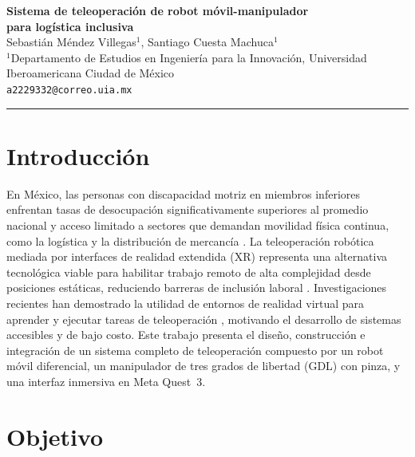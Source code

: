 \documentclass[12pt,letterpaper]{article}
\begin{document}
\begin{center}
    {\large\textbf{Sistema de teleoperación de robot móvil-manipulador\\
    para logística inclusiva}}\\[5pt]
    Sebastián Méndez Villegas$^{1}$, Santiago Cuesta Machuca$^{1}$\\[2pt]
    {\small $^{1}$Departamento de Estudios en Ingeniería para la Innovación,
    Universidad Iberoamericana Ciudad de México}\\[1pt]
    {\small \texttt{a2229332@correo.uia.mx}}
\end{center}
\vspace{4pt}\hrule\vspace{6pt}

\section{Introducción}

En México, las personas con discapacidad motriz en miembros inferiores enfrentan
tasas de desocupación significativamente superiores al promedio nacional y acceso
limitado a sectores que demandan movilidad física continua, como la logística y la
distribución de mercancía \cite{inegi2023}. La teleoperación robótica mediada por
interfaces de realidad extendida (XR) representa una alternativa tecnológica viable
para habilitar trabajo remoto de alta complejidad desde posiciones estáticas, reduciendo
barreras de inclusión laboral \cite{sheridan1992}. Investigaciones recientes han
demostrado la utilidad de entornos de realidad virtual para aprender y ejecutar tareas
de teleoperación \cite{lipton2018}, motivando el desarrollo de sistemas accesibles y
de bajo costo. Este trabajo presenta el diseño, construcción e integración de un
sistema completo de teleoperación compuesto por un robot móvil diferencial, un
manipulador de tres grados de libertad (GDL) con pinza, y una interfaz inmersiva en
Meta Quest~3.

\section{Objetivo}
\end{document}
